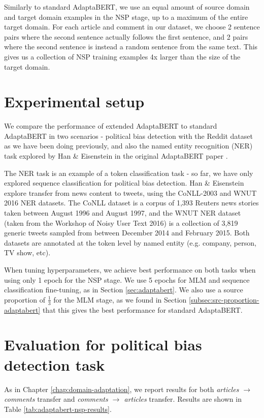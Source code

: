 Similarly to standard AdaptaBERT, we use an equal amount of source domain and target domain examples in the NSP stage, up to a maximum of the entire target domain. For each article and comment in our dataset, we choose 2 sentence pairs where the second sentence actually follows the first sentence, and 2 pairs where the second sentence is instead a random sentence from the same text. This gives us a collection of NSP training examples 4x larger than the size of the target domain.

\section{Experimental setup}

We compare the performance of extended AdaptaBERT to standard AdaptaBERT in two scenarios - political bias detection with the Reddit dataset as we have been doing previously, and also the named entity recognition (NER) task explored by Han \& Eisenstein in the original AdaptaBERT paper \cite{adaptabert}.

The NER task is an example of a token classification task - so far, we have only explored sequence classification for political bias detection. Han \& Eisenstein explore transfer from news content to tweets, using the CoNLL-2003 and WNUT 2016 NER datasets. The CoNLL dataset \cite{conll} is a corpus of 1,393 Reuters news stories \cite{reuters} taken between August 1996 and August 1997, and the WNUT NER dataset \cite{wnut} (taken from the Workshop of Noisy User Text 2016) is a collection of 3,819 generic tweets sampled from between December 2014 and February 2015. Both datasets are annotated at the token level by named entity (e.g. company, person, TV show, etc).

When tuning hyperparameters, we achieve best performance on both tasks when using only 1 epoch for the NSP stage. We use 5 epochs for MLM and sequence classification fine-tuning, as in Section \ref{sec:adaptabert}. We also use a source proportion of $ \frac{1}{3} $ for the MLM stage, as we found in Section \ref{subsec:src-proportion-adaptabert} that this gives the best performance for standard AdaptaBERT.

\section{Evaluation for political bias detection task} \label{sec:nsp-evaluation-political-bias}

As in Chapter \ref{chap:domain-adaptation}, we report results for both \textit{articles $ \rightarrow $ comments} transfer and \textit{comments $ \rightarrow $ articles} transfer. Results are shown in Table \ref{tab:adaptabert-nsp-results}.

